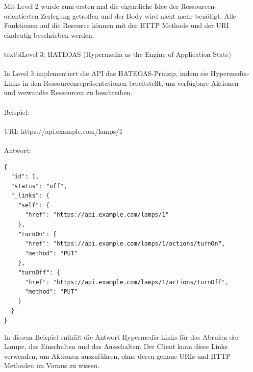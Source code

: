 Mit Level 2 wurde zum ersten mal die eigentliche Idee der Ressourcen-orientierten Zerlegung getroffen und der Body wird nicht mehr benötigt. Alle Funktionen auf die Resource können mit der HTTP Methode und der URI eindeutig beschrieben werden. 
\\\\
textbf{Level 3}: HATEOAS (Hypermedia as the Engine of Application State)
\\\\
In Level 3 implementiert die API das HATEOAS-Prinzip, indem sie Hypermedia-Links in den Ressourcenrepräsentationen bereitstellt, um verfügbare Aktionen und verwandte Ressourcen zu beschreiben.
\\\\
Beispiel:
\\\\
URI: https://api.example.com/lamps/1
\\\\
Antwort:\\
\noindent\begin{minipage}{\textwidth}
\begin{lstlisting}[caption={Level 3 (HATEOAS)},captionpos=b,label={lst:level_3}]
{
  "id": 1,
  "status": "off",
  "_links": {
    "self": {
      "href": "https://api.example.com/lamps/1"
    },
    "turnOn": {
      "href": "https://api.example.com/lamps/1/actions/turnOn",
      "method": "PUT"
    },
    "turnOff": {
      "href": "https://api.example.com/lamps/1/actions/turnOff",
      "method": "PUT"
    }
  }
}
\end{lstlisting}
\end{minipage}
In diesem Beispiel enthält die Antwort Hypermedia-Links für das Abrufen der Lampe, das Einschalten und das Ausschalten. Der Client kann diese Links verwenden, um Aktionen auszuführen, ohne deren genaue URIs und HTTP-Methoden im Voraus zu wissen.

